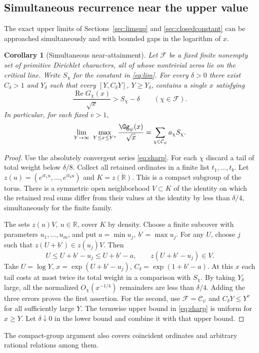 \documentclass[a4paper,11pt]{article}
\newtheorem{corollary}[proposition]{Corollary}
\theoremstyle{definition}
\theoremstyle{remark}
\newcommand{\RR}{\mathbb R}\newcommand{\CC}{\mathbb C}\newcommand{\QQ}{\mathbb Q}
\newcommand{\real}{\operatorname{Re}}\newcommand{\imag}{\operatorname{Im}}
\numberwithin{equation}{section}
\begin{document}
\subsection{Simultaneous recurrence near the upper value}\label{nav:I-11}
\label{sec:peaks}
The exact upper limits of Sections~\ref{sec:limsup} and \ref{sec:closedconstant} can be approached simultaneously and with bounded gaps in the logarithm of \(x\).

\begin{corollary}[Simultaneous near-attainment]\label{cor:peaks}
Let \(\mathcal F\) be a fixed finite nonempty set of primitive Dirichlet characters, all of whose nontrivial zeros lie on the critical line. Write \(S_\chi\) for the constant in \eqref{eq:lim}. For every \(\delta>0\) there exist \(C_\delta>1\) and \(Y_\delta\) such that every \([Y,C_\delta Y]\), \(Y\ge Y_\delta\), contains a single \(x\) satisfying
\[
                   \frac{\real G_\chi(x)}{\sqrt{x}}>S_\chi-\delta
                       \qquad(\chi\in\mathcal F).
\]
In particular, for each fixed \(v>1\),
\[
 \lim_{Y\to\infty}\ \max_{Y\le x\le Y^v}\frac{\Gg_\psi(x)}{\sqrt x}
              =\sum_{\chi\in\mathcal C_\psi}a_\chi S_\chi .
\]
\end{corollary}
\begin{proof}
Use the absolutely convergent series \eqref{eq:sharp}. For each \(\chi\) discard a tail of total weight below \(\delta/8\). Collect all retained ordinates in a finite list \(t_1,\ldots,t_b\). Let \(z(u)=(e^{it_1u},\ldots,e^{it_bu})\) and \(K=\overline{z(\RR)}\). This is a compact subgroup of the torus. There is a symmetric open neighborhood \(V\subset K\) of the identity on which the retained real sums differ from their values at the identity by less than \(\delta/4\), simultaneously for the finite family.

The sets \(z(u)V,\ u\in\RR\), cover \(K\) by density. Choose a finite subcover with parameters \(u_1,\ldots,u_m\), and put \(a=\min u_j,\ b'=\max u_j\). For any \(U\), choose \(j\) such that \(z(U+b')\in z(u_j)V\). Then
\[
                    U\le U+b'-u_j\le U+b'-a,\qquad z(U+b'-u_j)\in V .
\]
Take \(U=\log Y\), \(x=\exp(U+b'-u_j)\), \(C_\delta=\exp(1+b'-a)\). At this \(x\) each tail costs at most twice its total weight in a comparison with \(S_\chi\). By taking \(Y_\delta\) large, all the normalized \(O_\chi(x^{-1/4})\) remainders are less than \(\delta/4\). Adding the three errors proves the first assertion. For the second, use \(\mathcal F=\mathcal C_\psi\) and \(C_\delta Y\le Y^v\) for all sufficiently large \(Y\). The termwise upper bound in \eqref{eq:sharp} is uniform for \(x\ge Y\). Let \(\delta\downarrow0\) in the lower bound and combine it with that upper bound.
\end{proof}
The compact-group argument also covers coincident ordinates and arbitrary rational relations among them.
\end{document}
